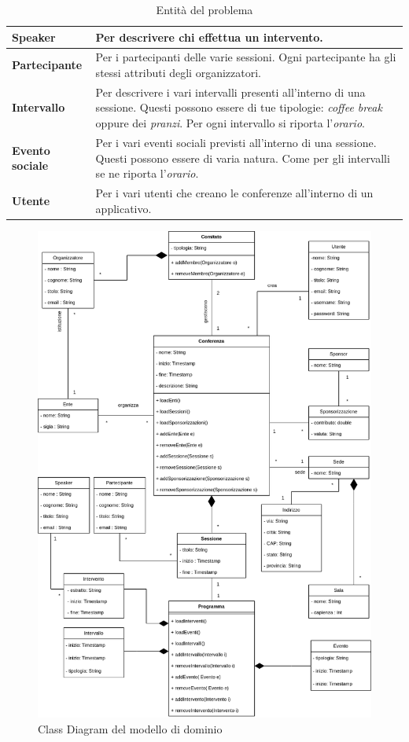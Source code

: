 \begin{table}[h!]
\begin{tabularx}{\textwidth}{|l|X|}
\textbf{Speaker} & Per descrivere chi effettua un intervento. \\ \hline
\textbf{Partecipante} & Per i partecipanti delle varie sessioni. Ogni partecipante ha gli stessi attributi degli organizzatori. \\ \hline
\textbf{Intervallo} & Per descrivere i vari intervalli presenti all'interno di una sessione. Questi possono essere di tue tipologie: \textit{coffee break} oppure dei \textit{pranzi}. Per ogni intervallo si riporta l'\textit{orario}. \\ \hline
\textbf{Evento sociale} & Per i vari eventi sociali previsti all'interno di una sessione. Questi possono essere di varia natura. Come per gli intervalli se ne riporta l'\textit{orario}. \\ \hline
\textbf{Utente} & Per i vari utenti che creano le conferenze all'interno di un applicativo. \\ \hline
\end{tabularx}
\caption{Entità del problema}\label{tab:entities}
\end{table}

\begin{figure}[h!]
\centering
\includegraphics[scale=0.6]{Immagini/Schema_Concettuale.png}
\caption{Class Diagram del modello di dominio}\label{uml:modellodominio}
\end{figure}